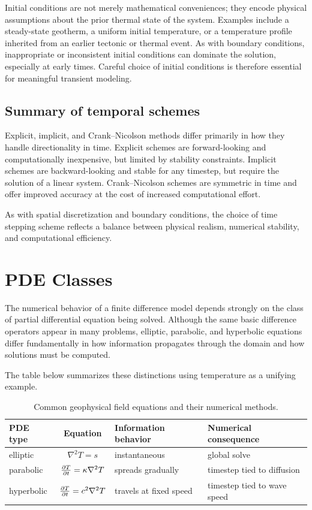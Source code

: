 Initial conditions are not merely mathematical conveniences; they encode physical assumptions about the prior thermal state of the system. Examples include a steady-state geotherm, a uniform initial temperature, or a temperature profile inherited from an earlier tectonic or thermal event.  As with boundary conditions, inappropriate or inconsistent initial conditions can dominate the solution, especially at early times. Careful choice of initial conditions is therefore essential for meaningful transient modeling.

\subsection{Summary of temporal schemes}

Explicit, implicit, and Crank--Nicolson methods differ primarily in how they handle directionality in time. Explicit schemes are forward-looking and computationally inexpensive, but limited by stability constraints. Implicit schemes are backward-looking and stable for any timestep, but require the solution of a linear system. Crank--Nicolson schemes are symmetric in time and offer improved accuracy at the cost of increased computational effort.

As with spatial discretization and boundary conditions, the choice of time stepping scheme reflects a balance between physical realism, numerical stability, and computational efficiency.

\section{PDE Classes}

The numerical behavior of a finite difference model depends strongly on the class of partial differential equation being solved. Although the same basic difference operators appear in many problems, elliptic, parabolic, and hyperbolic equations differ fundamentally in how information propagates through the domain and how solutions must be computed.

The table below summarizes these distinctions using temperature as a unifying example.
\begin{table}
    \centering
    \caption{Common geophysical field equations and their numerical methods.}
    \label{tab:fdpde}
    \begin{tabular}{lcll}
        \toprule
        PDE type & Equation & Information behavior & Numerical consequence \\
        \midrule
        elliptic & $\nabla^2 T = s$ & instantaneous & global solve \\
        parabolic & $\pdv{T}{t} = \kappa\nabla^2T$ & spreads gradually & timestep tied to diffusion \\
        hyperbolic & $\pdv{T}{t} = c^2\nabla^2T$ & travels at fixed speed & timestep tied to wave speed \\
        \bottomrule
    \end{tabular}
\end{table}


